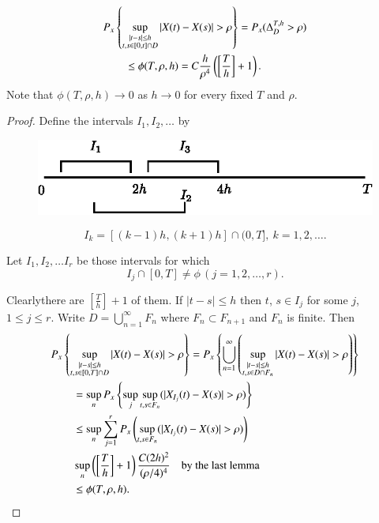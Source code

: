 \begin{lemma*}
\begin{align*}
& P_{x}\left\{\sup\limits_{\substack{|t-s|\leq h\\ t,s\in [0,t]\cap
    D}}|X(t)-X(s)|>\rho\right\}=P_{x}(\Delta^{T,h}_{D}>\rho)\\
&\qq \leq
  \phi(T,\rho,h)=C\frac{h}{\rho^{4}}\left(\left[\frac{T}{h}\right]+1\right). 
\end{align*}
Note that $\phi(T,\rho,h)\to 0$ as $h\to 0$ for every fixed $T$ and $\rho$.
\end{lemma*}

\begin{proof}
Define the intervals $I_{1},I_{2},\ldots$ by
\begin{figure}[H]
\centering
\includegraphics{figure/fig2.eps}
\end{figure}
$$
I_{k}=[(k-1)h,(k+1)h]\cap (0,T],\ k=1,2,\ldots .
$$

Let $I_{1},I_{2},\ldots I_{r}$ be those intervals for which
$$
I_{j}\cap [0,T]\neq \phi\,(j=1,2,\ldots,r).
$$

Clearly\pageoriginale there are $[\frac{T}{h}]+1$ of them. If
$|t-s|\leq h$ then $t$, $s\in I_{j}$ for some $j$, $1\leq j\leq
r$. Write $D=\bigcup\limits^{\infty}_{n=1}F_{n}$ where $F_{n}\subset
F_{n+1}$ and $F_{n}$ is finite. Then
\begin{align*}
& P_{x}\left\{\sup\limits_{\substack{|t-s|\leq h\\ t,s\in [0,T]\cap
      D}}|X(t)-X(s)|>\rho\right\}=P_{x}\left\{\bigcup^{\infty}_{n=1}\left(\sup\limits_{\substack{|t-s|\leq
  h\\ t,s\in D\cap F_{n}}}|X(t)-X(s)|>\rho\right)\right\}\\
&\qq =\sup\limits_{n}P_{x}\left\{\sup\limits_{j}\sup\limits_{t,s\in
    F_{n}}(|X_{I_{j}}(t)-X(s)|>\rho)\right\}\\
&\qq \leq \sup\limits_{n}\sum^{r}_{j=1}P_{x}\left(\sup\limits_{t,s\in
    F_{n}}(|X_{I_{j}}(t)-X(s)|>\rho)\right)\\
&\qq
  \sup\limits_{n}\left(\left[\frac{T}{h}\right]+1\right)\frac{C(2h)^{2}}{(\rho/4)^{4}}\q
  \text{by the last lemma}\\
&\qq \leq \phi(T,\rho,h).
\end{align*}
\end{proof}

